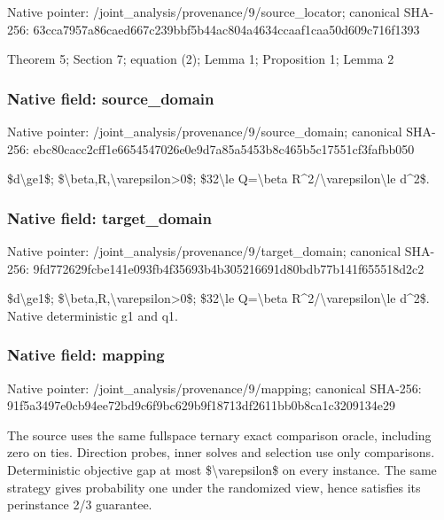 \documentclass[10pt,a4paper]{article}
\begin{document}
Native pointer: /joint\_analysis/provenan\allowbreak{}ce/9/source\_locator; canonical SHA-256: 63cca7957a86caed667c239b\allowbreak{}bf5b44ac804a4634ccaaf1ca\allowbreak{}a50d609c716f1393


Theorem 5; Section 7; equation (2); Lemma 1; Proposition 1; Lemma 2


\subsubsection{Native field: source\_domain}


Native pointer: /joint\_analysis/provenan\allowbreak{}ce/9/source\_domain; canonical SHA-256: ebc80cacc2cff1e665454702\allowbreak{}6e0e9d7a85a5453b8c465b5c\allowbreak{}17551cf3fafbb050


\$d\textbackslash{}ge1\$; \$\textbackslash{}beta,R,\textbackslash{}varepsilon>0\$; \$32\textbackslash{}le Q=\textbackslash{}beta R\textasciicircum{}2/\textbackslash{}varepsilon\textbackslash{}le d\textasciicircum{}2\$.


\subsubsection{Native field: target\_domain}


Native pointer: /joint\_analysis/provenan\allowbreak{}ce/9/target\_domain; canonical SHA-256: 9fd772629fcbe141e093fb4f\allowbreak{}35693b4b305216691d80bdb7\allowbreak{}7b141f655518d2c2


\$d\textbackslash{}ge1\$; \$\textbackslash{}beta,R,\textbackslash{}varepsilon>0\$; \$32\textbackslash{}le Q=\textbackslash{}beta R\textasciicircum{}2/\textbackslash{}varepsilon\textbackslash{}le d\textasciicircum{}2\$. Native deterministic g1 and q1.


\subsubsection{Native field: mapping}


Native pointer: /joint\_analysis/provenance/9/mapping; canonical SHA-256: 91f5a3497e0cb94ee72bd9c6\allowbreak{}f9bc629b9f18713df2611bb0\allowbreak{}b8ca1c3209134e29


The source uses the same fullspace ternary exact comparison oracle, including zero on ties. Direction probes, inner solves and selection use only comparisons. Deterministic objective gap at most \$\textbackslash{}varepsilon\$ on every instance. The same strategy gives probability one under the randomized view, hence satisfies its perinstance 2/3 guarantee.
\end{document}
